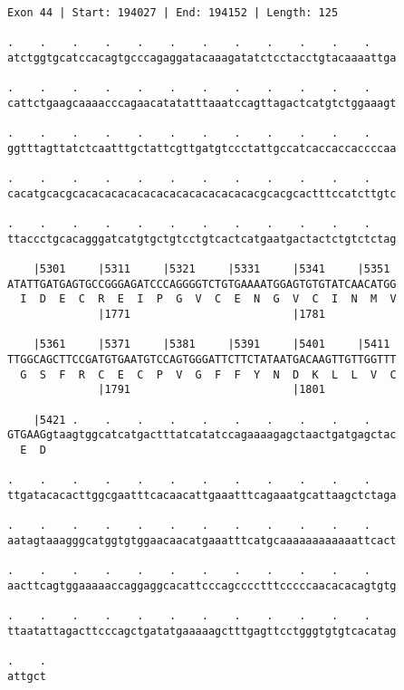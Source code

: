 \documentclass{article}
\begin{document}
\begin{Verbatim}[fontfamily=courier]
Exon 44 | Start: 194027 | End: 194152 | Length: 125

.    .    .    .    .    .    .    .    .    .    .    .    
atctggtgcatccacagtgcccagaggatacaaagatatctcctacctgtacaaaattga

.    .    .    .    .    .    .    .    .    .    .    .    
cattctgaagcaaaacccagaacatatatttaaatccagttagactcatgtctggaaagt

.    .    .    .    .    .    .    .    .    .    .    .    
ggtttagttatctcaatttgctattcgttgatgtccctattgccatcaccaccaccccaa

.    .    .    .    .    .    .    .    .    .    .    .    
cacatgcacgcacacacacacacacacacacacacacacgcacgcactttccatcttgtc

.    .    .    .    .    .    .    .    .    .    .    .    
ttaccctgcacagggatcatgtgctgtcctgtcactcatgaatgactactctgtctctag

    |5301     |5311     |5321     |5331     |5341     |5351 
ATATTGATGAGTGCCGGGAGATCCCAGGGGTCTGTGAAAATGGAGTGTGTATCAACATGG
  I  D  E  C  R  E  I  P  G  V  C  E  N  G  V  C  I  N  M  V
              |1771                         |1781           

    |5361     |5371     |5381     |5391     |5401     |5411 
TTGGCAGCTTCCGATGTGAATGTCCAGTGGGATTCTTCTATAATGACAAGTTGTTGGTTT
  G  S  F  R  C  E  C  P  V  G  F  F  Y  N  D  K  L  L  V  C
              |1791                         |1801           

    |5421 .    .    .    .    .    .    .    .    .    .    
GTGAAGgtaagtggcatcatgactttatcatatccagaaaagagctaactgatgagctac
  E  D                                                      

.    .    .    .    .    .    .    .    .    .    .    .    
ttgatacacacttggcgaatttcacaacattgaaatttcagaaatgcattaagctctaga

.    .    .    .    .    .    .    .    .    .    .    .    
aatagtaaagggcatggtgtggaacaacatgaaatttcatgcaaaaaaaaaaaattcact

.    .    .    .    .    .    .    .    .    .    .    .    
aacttcagtggaaaaaccaggaggcacattcccagcccctttcccccaacacacagtgtg

.    .    .    .    .    .    .    .    .    .    .    .    
ttaatattagacttcccagctgatatgaaaaagctttgagttcctgggtgtgtcacatag

.    .
attgct
\end{Verbatim}
\newpage
\end{document}
